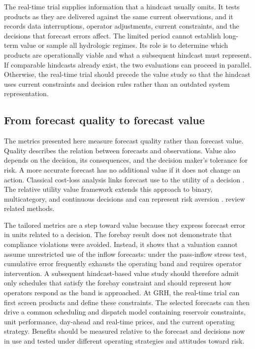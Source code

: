 \documentclass[MLA]{USG} %
\begin{document}
The real-time trial supplies information that a hindcast usually omits. It tests products as they are delivered against the same current observations, and it records data interruptions, operator adjustments, current constraints, and the decisions that forecast errors affect. The limited period cannot establish long-term value or sample all hydrologic regimes. Its role is to determine which products are operationally viable and what a subsequent hindcast must represent. If comparable hindcasts already exist, the two evaluations can proceed in parallel. Otherwise, the real-time trial should precede the value study so that the hindcast uses current constraints and decision rules rather than an outdated system representation.


\subsection{From forecast quality to forecast value}

The metrics presented here measure forecast quality rather than forecast value. Quality describes the relation between forecasts and observations. Value also depends on the decision, its consequences, and the decision maker's tolerance for risk. A more accurate forecast has no additional value if it does not change an action. Classical cost-loss analysis links forecast use to the utility of a decision \citep{thompsonEconomicUtilityWeather1955}. The relative utility value framework extends this approach to binary, multicategory, and continuous decisions and can represent risk aversion \citep{laugesenFlexibleForecastValue2023}. \citet{farkasEconomicValueWeather2025} review related methods.

The tailored metrics are a step toward value because they express forecast error in units related to a decision. The forebay result does not demonstrate that compliance violations were avoided. Instead, it shows that a valuation cannot assume unrestricted use of the inflow forecasts: under the pass-inflow stress test, cumulative error frequently exhausts the operating band and requires operator intervention. A subsequent hindcast-based value study should therefore admit only schedules that satisfy the forebay constraint and should represent how operators respond as the band is approached. At GRH, the real-time trial can first screen products and define these constraints. The selected forecasts can then drive a common scheduling and dispatch model containing reservoir constraints, unit performance, day-ahead and real-time prices, and the current operating strategy. Benefits should be measured relative to the forecast and decisions now in use and tested under different operating strategies and attitudes toward risk.
\end{document}
